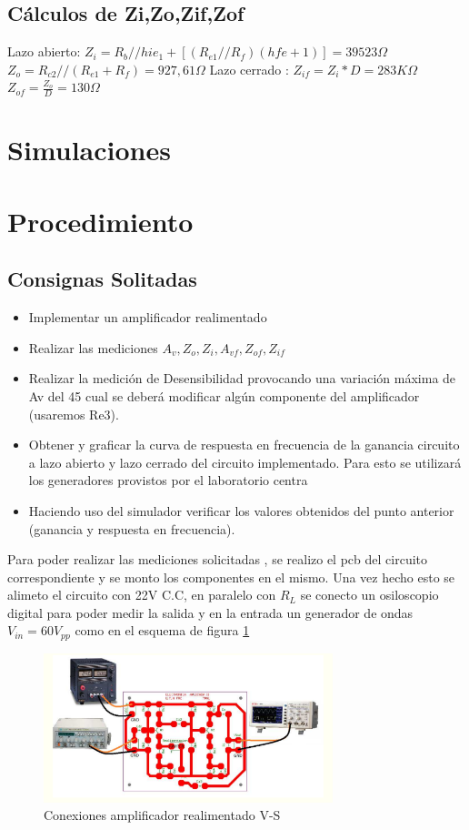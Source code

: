 \documentclass[12pt, letterpaper]{article}
\begin{document}
\subsection{Cálculos de Zi,Zo,Zif,Zof}
Lazo abierto:
$Z_i=R_b//{hie_1+[(R_{e1}//R_f)(hfe+1)]}=39523\Omega$
\singlespacing
$Z_o=R_{c2}//(R_{e1}+R_f)=927,61\Omega$
\singlespacing
Lazo cerrado :
$Z_{if}=Z_i*D=283K\Omega$
\singlespacing
$Z_{of}=\frac{Z_o}{D}=130\Omega$
\section{Simulaciones}

\section{Procedimiento}
\subsection{Consignas Solitadas}
\begin{itemize}
	\item  Implementar un amplificador realimentado
    \item  Realizar las mediciones $A_v, Z_o,Z_i, A_{vf},Z_{of},Z_{if} $
    \item  Realizar la medición de Desensibilidad provocando una variación máxima de Av del 45%
	cual se deberá modificar algún componente del amplificador (usaremos Re3).
    \item Obtener y graficar la curva de respuesta en frecuencia de la ganancia circuito a lazo abierto y lazo
	cerrado del circuito implementado. Para esto se utilizará los generadores provistos por el
	laboratorio centra
    \item Haciendo uso del simulador verificar los valores obtenidos del punto anterior (ganancia y
	respuesta en frecuencia).
\end{itemize}
Para poder realizar las mediciones solicitadas , se realizo el pcb del circuito correspondiente y se monto los componentes en el mismo.
Una vez hecho esto se alimeto el circuito con 22V C.C, en paralelo con $R_L$ se conecto un osiloscopio digital para poder medir la salida y en la entrada un generador de ondas $V_{in}= 60 V_{pp}$ como en el esquema de figura \ref{fig:4.1}
\begin{figure}[h]
	\centering
	\includegraphics[width=0.75\textwidth]{Imagenes/conexion.png}
	\caption{Conexiones amplificador realimentado V-S}
	\label{fig:4.1}
\end{figure}
\end{document}
